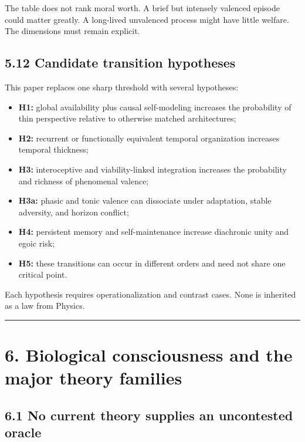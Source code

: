 \documentclass[
  11pt,
]{article}
\providecommand{\tightlist}{%
  \setlength{\itemsep}{0pt}\setlength{\parskip}{0pt}}
\begin{document}
The table does not rank moral worth. A brief but intensely valenced
episode could matter greatly. A long-lived unvalenced process might have
little welfare. The dimensions must remain explicit.

\subsection{5.12 Candidate transition
hypotheses}\label{candidate-transition-hypotheses}

This paper replaces one sharp threshold with several hypotheses:

\begin{itemize}
\tightlist
\item
  \textbf{H1:} global availability plus causal self-modeling increases
  the probability of thin perspective relative to otherwise matched
  architectures;
\item
  \textbf{H2:} recurrent or functionally equivalent temporal
  organization increases temporal thickness;
\item
  \textbf{H3:} interoceptive and viability-linked integration increases
  the probability and richness of phenomenal valence;
\item
  \textbf{H3a:} phasic and tonic valence can dissociate under
  adaptation, stable adversity, and horizon conflict;
\item
  \textbf{H4:} persistent memory and self-maintenance increase
  diachronic unity and egoic risk;
\item
  \textbf{H5:} these transitions can occur in different orders and need
  not share one critical point.
\end{itemize}

Each hypothesis requires operationalization and contrast cases. None is
inherited as a law from Physics.

\begin{center}\rule{0.5\linewidth}{0.5pt}\end{center}

\section{6. Biological consciousness and the major theory
families}\label{biological-consciousness-and-the-major-theory-families}

\subsection{6.1 No current theory supplies an uncontested
oracle}\label{no-current-theory-supplies-an-uncontested-oracle}
\end{document}
